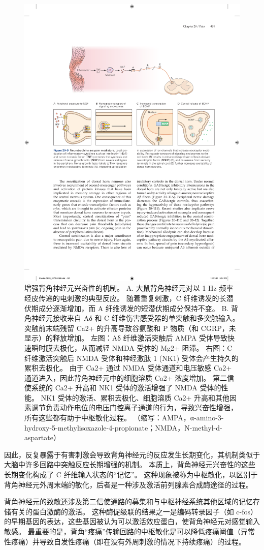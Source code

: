 \begin{figure}[htbp]
	\centering
	\includegraphics[width=0.7\linewidth]{chap20/fig_20_9}
	\caption{增强背角神经元兴奋性的机制。 
		A. 大鼠背角神经元对以 1 Hz 频率经皮传递的电刺激的典型反应。 随着重复刺激，C 纤维诱发的长潜伏期成分逐渐增加，而 A 纤维诱发的短潜伏期成分保持不变。 
		B. 背角神经元接收来自 Aδ 和 C 纤维伤害感受器的单突触和多突触输入。 
		突触前末端残留 Ca2+ 的升高导致谷氨酸和 P 物质（和 CGRP，未显示）的释放增加。
		左图：Aδ 纤维激活突触后 AMPA 受体导致快速瞬时膜去极化，从而减轻 NMDA 受体的 Mg2+ 阻滞。 
		右图：C 纤维激活突触后 NMDA 受体和神经激肽 1 (NK1) 受体会产生持久的累积去极化。 
		由于 Ca2+ 通过 NMDA 受体通道和电压敏感 Ca2+ 通道进入，因此背角神经元中的细胞溶质 Ca2+ 浓度增加。 
		第二信使系统的 Ca2+ 升高和 NK1 受体的激活增强了 NMDA 受体的性能。 
		NK1 受体的激活、累积去极化、细胞溶质 Ca2+ 升高和其他因素调节负责动作电位的电压门控离子通道的行为，导致兴奋性增强，所有这些都有助于中枢敏化过程。 （缩写：AMPA，α-amino-3-hydroxy-5-methylisoxazole-4-propionate；NMDA，N-methyl-d-aspartate）}
	\label{fig:20_10}
\end{figure}

因此，反复暴露于有害刺激会导致背角神经元的反应发生长期变化，其机制类似于大脑中许多回路中突触反应长期增强的机制。 
本质上，背角神经元兴奋性的这些长期变化构成了 C 纤维输入状态的“记忆”。 
这种现象被称为中枢敏化，以区别于背角神经元外周末端的敏化，后者是一种涉及激活前列腺素合成酶途径的过程。


背角神经元的致敏还涉及第二信使通路的募集和与中枢神经系统其他区域的记忆存储有关的蛋白激酶的激活。 
这种酶促级联的结果之一是编码转录因子（如 c-fos）的早期基因的表达，这些基因被认为可以激活效应蛋白，使背角神经元对感觉输入敏感。 
最重要的是，背角“疼痛”传输回路的中枢敏化是可以降低疼痛阈值（异常性疼痛）并导致自发性疼痛（即在没有外周刺激的情况下持续疼痛）的过程。


